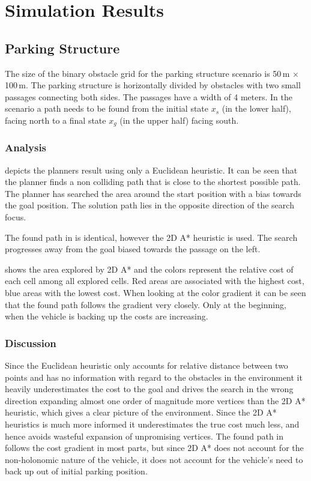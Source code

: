 \section{Simulation Results}

\subsection{Parking Structure}
The size of the binary obstacle grid for the parking structure scenario is 50\,m $\times$ 100\,m. The parking structure is horizontally divided by obstacles with two small passages connecting both sides. The passages have a width of 4 meters. In the scenario a path needs to be found from the initial state $x_s$ (in the lower half), facing north to a final state $x_g$ (in the upper half) facing south.

\subsubsection{Analysis}
 depicts the planners result using only a Euclidean heuristic. It can be seen that the planner finds a non colliding path that is close to the shortest possible path. The planner has searched the area around the start position with a bias towards the goal position. The solution path lies in the opposite direction of the search focus.

The found path in  is identical, however the 2D A* heuristic is used. The search progresses away from the goal biased towards the passage on the left.

 shows the area explored by 2D A* and the colors represent the relative cost of each cell among all explored cells. Red areas are associated with the highest cost, blue areas with the lowest cost. When looking at the color gradient it can be seen that the found path follows the gradient very closely. Only at the beginning, when the vehicle is backing up the costs are increasing. 

\subsubsection{Discussion}
Since the Euclidean heuristic only accounts for relative distance between two points and has no information with regard to the obstacles in the environment it heavily underestimates the cost to the goal and drives the search in the wrong direction expanding almost one order of magnitude more vertices than the 2D A* heuristic, which gives a clear picture of the environment. Since the 2D A* heuristics is much more informed it underestimates the true cost much less, and hence avoids wasteful expansion of unpromising vertices. The found path in  follows the cost gradient in most parts, but since 2D A* does not account for the non-holonomic nature of the vehicle, it does not account for the vehicle's need to back up out of initial parking position.

